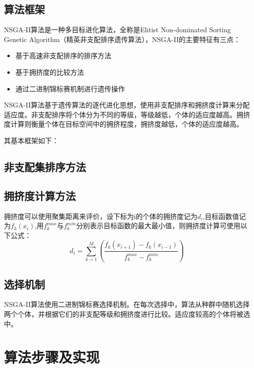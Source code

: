 \documentclass[lang=cn,a4paper,citestyle=gb7714-2015, bibstyle=gb7714-2015]{elegantpaper}
\begin{document}
    \subsection{算法框架}
    NSGA-II算法是一种多目标进化算法，全称是Elitist Non-dominated Sorting Genetic Algorithm（精英非支配排序遗传算法），NSGA-II的主要特征有三点：
    \begin{itemize}
        \item 基于高速非支配排序的排序方法
        \item 基于拥挤度的比较方法
        \item 通过二进制锦标赛机制进行遗传操作
    \end{itemize}

    NSGA-II算法基于遗传算法的逐代进化思想，使用非支配排序和拥挤度计算来分配适应度。非支配排序将个体分为不同的等级，等级越低，个体的适应度越高。拥挤度计算则衡量个体在目标空间中的拥挤程度，拥挤度越低，个体的适应度越高。

    其基本框架如下：

    \subsection{非支配集排序方法}


    \subsection{拥挤度计算方法}
    拥挤度可以使用聚集距离来评价，设下标为i的个体的拥挤度记为$d_i$,目标函数值记为$f_k(x_i)$,用$f_k^{max}$与$f_k^{min}$分别表示目标函数的最大最小值，则拥挤度计算可使用以下公式：
    $$d_i = \sum_{k=1}^M(\dfrac{f_k(x_{i+1}) - f_k(x_{i-1})}{f_k^{max} - f_k^{min}})$$


    \subsection{选择机制}
    NSGA-II算法使用二进制锦标赛选择机制。在每次选择中，算法从种群中随机选择两个个体，并根据它们的非支配等级和拥挤度进行比较。适应度较高的个体将被选中。

    \section{算法步骤及实现}
\end{document}
